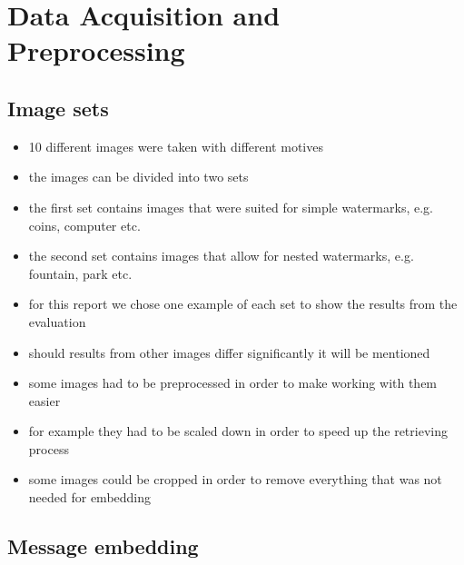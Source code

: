 \section{Data Acquisition and Preprocessing}

\subsection{Image sets}

\begin{itemize}
    \item 10 different images were taken with different motives
    \item the images can be divided into two sets
    \item the first set contains images that were suited for simple watermarks, e.g. coins, computer etc.
    \item the second set contains images that allow for nested watermarks, e.g. fountain, park etc.
    \item for this report we chose one example of each set to show the results from the evaluation
    \item should results from other images differ significantly it will be mentioned
    \item some images had to be preprocessed in order to make working with them easier
    \item for example they had to be scaled down in order to speed up the retrieving process 
    \item some images could be cropped in order to remove everything that was not needed for embedding
\end{itemize}


\subsection{Message embedding}


